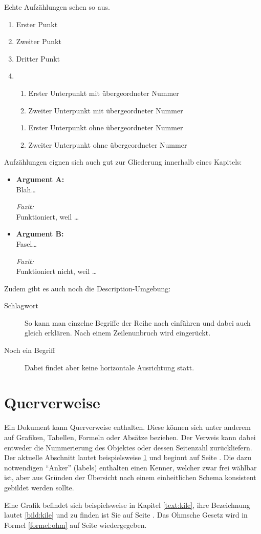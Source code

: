 Echte Aufzählungen sehen so aus.

\begin{enumerate}
\item Erster Punkt
\item Zweiter Punkt
\item Dritter Punkt
\item \begin{enumerate}
      \item Erster Unterpunkt mit übergeordneter Nummer
      \item Zweiter Unterpunkt mit übergeordneter Nummer
      \end{enumerate}
\begin{enumerate}
      \item Erster Unterpunkt ohne übergeordneter Nummer
      \item Zweiter Unterpunkt ohne übergeordneter Nummer
      \end{enumerate}
\end{enumerate}

Aufzählungen eignen sich auch gut zur Gliederung innerhalb
eines Kapitels:

\begin{itemize}
\item\textbf{Argument A:}\\
      Blah\ldots

      \emph{Fazit:}\\
      Funktioniert, weil \ldots
\item\textbf{Argument B:}\\
      Fasel\ldots

      \emph{Fazit:}\\
      Funktioniert nicht, weil \ldots
\end{itemize}

Zudem gibt es auch noch die Description-Umgebung:
\begin{description}
\item[Schlagwort]
      So kann man einzelne Begriffe der Reihe nach einführen und
      dabei auch gleich erklären. Nach einem Zeilenunbruch
      wird eingerückt.
\item[Noch ein Begriff]
      Dabei findet aber keine horizontale Ausrichtung statt.
\end{description}


\section{Querverweise}
\label{text:querverweise}
Ein Dokument kann Querverweise enthalten. Diese können sich unter anderem
auf Grafiken, Tabellen, Formeln oder Absätze beziehen. Der Verweis kann dabei
entweder die Nummerierung des Objektes oder dessen Seitenzahl zurückliefern.
Der aktuelle Abschnitt lautet
beispielsweise \ref{text:querverweise} und beginnt auf Seite \pageref{text:querverweise}.
Die dazu notwendigen "`Anker"' ({\ttfamily labels}) enthalten einen Kenner, welcher zwar
frei wählbar ist, aber aus Gründen der Übersicht nach einem einheitlichen Schema konsistent gebildet werden sollte.

Eine Grafik befindet sich beispielsweise in Kapitel \ref{text:kile}, ihre Bezeichnung
lautet \ref{bild:kile} und zu finden ist Sie auf Seite \pageref{bild:kile}.
Das Ohmsche Gesetz wird in Formel \ref{formel:ohm} auf Seite \pageref{formel:ohm}
wiedergegeben.

